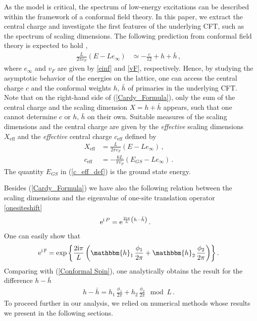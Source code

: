 \documentclass[12pt]{article}
\numberwithin{equation}{section}
\newcommand{\ri}{{\rm i}}
\newcommand{\re}{{\rm e}}
\begin{document}
	As the model is critical, the spectrum of low-energy excitations can be described within the framework of a conformal field theory. In this paper, we extract the central charge and investigate the first features of the underlying CFT, such as the spectrum of scaling dimensions. The following prediction from conformal field theory is expected to hold \cite{BlCN86,Affl86,Card86a},
	\begin{align}
		\frac{L}{2\pi v_F}\left(E -Le_\infty\right)&\simeq -\frac{c}{12}+h+\bar{h} \,,\label{Cardy_Formula}
	\end{align}
	where $e_\infty$ and $v_F$ are given by \eqref{einf} and \eqref{vF}, respectively. Hence, by studying the asymptotic behavior of the energies on the lattice, one can access the central charge $c$ and the conformal weights $h,\,\bar{h}$ of primaries in the  underlying CFT. Note that on the right-hand side of (\ref{Cardy_Formula}), only the sum of the central charge and the scaling dimension $X=h+\bar{h}$ appears, such that one cannot determine $c$ or $h,\, \bar{h}$ on their own. Suitable measures of the scaling dimensions and the central charge are given by the \emph{effective} scaling dimensions $X_{\mathrm{eff}}$ and the \emph{effective} central charge $c_{\mathrm{eff}}$ defined by
	\begin{align}
		X_{\mathrm{eff}}&= \frac{L}{2\pi v_F}\left(E -Le_\infty\right)\label{X_eff_def} \,, \\
		c_{\mathrm{eff}}&=-\frac{6L}{\pi v_F}\left(E_{GS} -Le_\infty\right)\label{c_eff_def} \,.
	\end{align}
	The quantity $E_{GS}$ in (\ref{c_eff_def}) is the ground state energy.
	
	Besides (\ref{Cardy_Formula}) we have also the following relation between the scaling dimensions and the eigenvalue of one-site translation operator \eqref{onesiteshift}
	\begin{align}
		\re^{\ri \, P}&=\re^{\frac{2\ri \pi}{L}\left(h-\bar{h}\right)}\,.\label{Conformal Spin}
	\end{align}
	One can easily show that 
	\begin{align}
		\re^{\ri \, \mathbb{P}}=\exp{\left\{ \frac{2\ri \pi}{L} \left( \mathbbm{h}_1 \, \frac{\phi_1}{2\pi}+\mathbbm{h}_2\,\frac{\phi_2}{2\pi}\right)\right\}}\,.
	\end{align}
	Comparing with (\ref{Conformal Spin}), one analytically obtains the result for the difference $h-\bar{h}$
	\begin{align}
		h-\bar{h}=h_1 \,\frac{\phi_1}{2\pi}+h_2\,\frac{\phi_2}{2\pi} \mod L\,.\label{h-barh}
	\end{align}
	To proceed further in our analysis, we relied on numerical methods whose results we present in the following sections.
	
\end{document}
